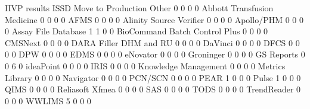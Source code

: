 \documentclass{article}
\begin{document}
\begin{Schunk}
\begin{Soutput}
                                IIVP results ISSD Move to Production Other
                                           0    0                  0     0
  Abbott Transfusion Medicine              0    0                  0     0
  AFMS                                     0    0                  0     0
  Alinity Source Verifier                  0    0                  0     0
  Apollo/PHM                               0    0                  0     0
  Assay File Database                      1    1                  0     0
  BioCommand Batch Control Plus            0    0                  0     0
  CMSNext                                  0    0                  0     0
  DARA Filler DHM and RU                   0    0                  0     0
  DaVinci                                  0    0                  0     0
  DFCS                                     0    0                  0     0
  DPW                                      0    0                  0     0
  EDMS                                     0    0                  0     0
  eNovator                                 0    0                  0     0
  Groninger                                0    0                  0     0
  GS Reports                               0    0                  6     0
  ideaPoint                                0    0                  0     0
  IRIS                                     0    0                  0     0
  Knowledge Management                     0    0                  0     0
  Metrics Library                          0    0                  0     0
  Navigator                                0    0                  0     0
  PCN/SCN                                  0    0                  0     0
  PEAR                                     1    0                  0     0
  Pulse                                    1    0                  0     0
  QIMS                                     0    0                  0     0
  Reliasoft Xfmea                          0    0                  0     0
  SAS                                      0    0                  0     0
  TODS                                     0    0                  0     0
  TrendReader                              0    0                  0     0
  WWLIMS                                   5    0                  0     0
                               

\end{Soutput}
\end{Schunk}
\end{document}
